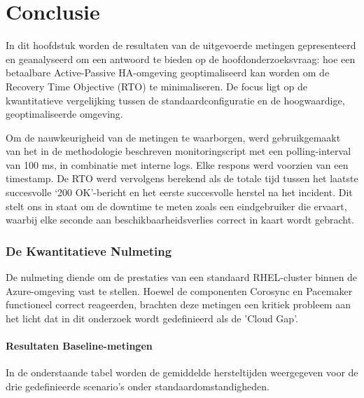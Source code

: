 
\chapter{Conclusie}%
\label{ch:conclusie}


In dit hoofdstuk worden de resultaten van de uitgevoerde metingen gepresenteerd en geanalyseerd om een antwoord te bieden op de hoofdonderzoeksvraag: hoe een betaalbare Active-Passive HA-omgeving geoptimaliseerd kan worden om de Recovery Time Objective (RTO) te minimaliseren. De focus ligt op de kwantitatieve vergelijking tussen de standaardconfiguratie en de hoogwaardige, geoptimaliseerde omgeving.
\medskip

Om de nauwkeurigheid van de metingen te waarborgen, werd gebruikgemaakt van het in de methodologie beschreven monitoringscript met een polling-interval van 100 ms, in combinatie met interne logs. Elke respons werd voorzien van een timestamp. De RTO werd vervolgens berekend als de totale tijd tussen het laatste succesvolle ‘200 OK’-bericht en het eerste succesvolle herstel na het incident. Dit stelt ons in staat om de downtime te meten zoals een eindgebruiker die ervaart, waarbij elke seconde aan beschikbaarheidsverlies correct in kaart wordt gebracht.

\subsection{De Kwantitatieve Nulmeting}
De nulmeting diende om de prestaties van een standaard RHEL-cluster binnen de Azure-omgeving vast te stellen. Hoewel de componenten Corosync en Pacemaker functioneel correct reageerden, brachten deze metingen een kritiek probleem aan het licht dat in dit onderzoek wordt gedefinieerd als de 'Cloud Gap'.

\subsubsection{Resultaten Baseline-metingen}
In de onderstaande tabel worden de gemiddelde hersteltijden weergegeven voor de drie gedefinieerde scenario's onder standaardomstandigheden.

